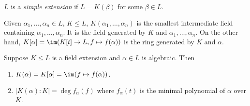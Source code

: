\documentclass[a4paper]{article}
\begin{document}
\begin{definition}
  \(L\) is a \emph{simple extension} if \(L = K(\beta)\) for some \(\beta \in L\).
\end{definition}

Given \(\alpha_1, \dots, \alpha_n \in L\), \(K \leq L\), \(K(\alpha_1, \dots, \alpha_n)\) is the smallest intermediate field containing \(\alpha_1, \dots, \alpha_n\). It is the field generated by \(K\) and \(\alpha_1, \dots, \alpha_n\). On the other hand, \(K[\alpha] = \im (K[t] \to L, f \mapsto f(\alpha))\) is the ring generated by \(K\) and \(\alpha\).

\begin{theorem}
  Suppose \(K \leq L\) is a field extension and \(\alpha \in L\) is algebraic. Then
  \begin{enumerate}
  \item \(K(\alpha) = K[\alpha] = \im (f \mapsto f(\alpha))\).
  \item \(|K(\alpha):K| = \deg f_\alpha(f)\) where \(f_\alpha(t)\) is the minimal polynomial of \(\alpha\) over \(K\).
  \end{enumerate}
\end{theorem}
\end{document}
